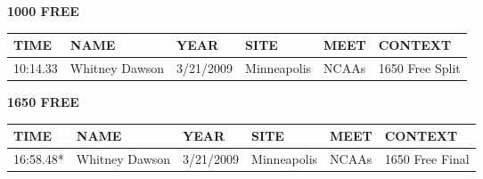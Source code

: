 \begin{minipage}[t]{0.48\textwidth}
\centering
\textbf{1000 FREE}\\[0.05cm]
\begin{tabular}{@{}p{1.8cm}p{2.8cm}p{1.2cm}p{1.4cm}p{1.4cm}p{2.0cm}@{}}
\hline
\textbf{TIME} & \textbf{NAME} & \textbf{YEAR} & \textbf{SITE} & \textbf{MEET} & \textbf{CONTEXT} \\
\hline
10:14.33 & Whitney Dawson & 3/21/2009 & Minneapolis & NCAAs & 1650 Free Split \\
\hline
\end{tabular}
\end{minipage}\hfill
\begin{minipage}[t]{0.48\textwidth}
\centering
\textbf{1650 FREE}\\[0.05cm]
\begin{tabular}{@{}p{1.8cm}p{2.8cm}p{1.2cm}p{1.4cm}p{1.4cm}p{2.0cm}@{}}
\hline
\textbf{TIME} & \textbf{NAME} & \textbf{YEAR} & \textbf{SITE} & \textbf{MEET} & \textbf{CONTEXT} \\
\hline
16:58.48* & Whitney Dawson & 3/21/2009 & Minneapolis & NCAAs & 1650 Free Final \\
\hline
\end{tabular}
\end{minipage}

\vspace{0.4cm}

